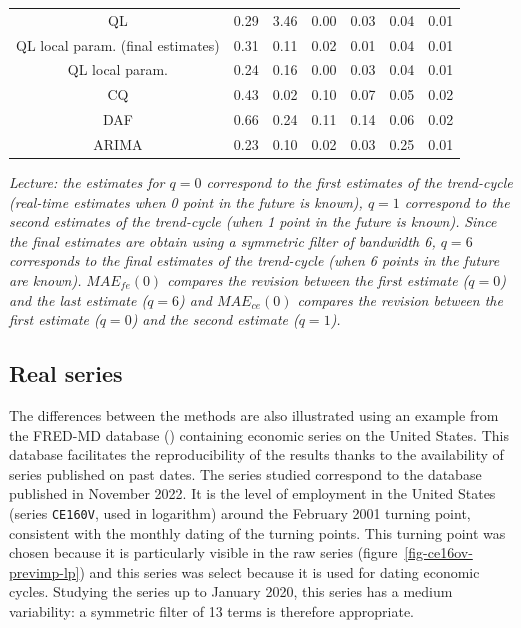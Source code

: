\documentclass[
]{article}
\newcommand\1{\mathds{1}}
\begin{document}
\begin{table}
{\begin{tabular}{ccccccc}
\hspace{1em}QL & 0.29 & 3.46 & 0.00 & 0.03 & 0.04 & 0.01\\
\hspace{1em}QL local param. (final estimates) & 0.31 & 0.11 & 0.02 & 0.01 & 0.04 & 0.01\\
\hspace{1em}QL local param. & 0.24 & 0.16 & 0.00 & 0.03 & 0.04 & 0.01\\
\hspace{1em}CQ & 0.43 & 0.02 & 0.10 & 0.07 & 0.05 & 0.02\\
\hspace{1em}DAF & 0.66 & 0.24 & 0.11 & 0.14 & 0.06 & 0.02\\
\hspace{1em}ARIMA & 0.23 & 0.10 & 0.02 & 0.03 & 0.25 & 0.01\\
\bottomrule
\end{tabular}

\justifying

\emph{Lecture: the estimates for \(q=0\) correspond to the first
estimates of the trend-cycle (real-time estimates when 0 point in the
future is known), \(q=1\) correspond to the second estimates of the
trend-cycle (when 1 point in the future is known).} \emph{Since the
final estimates are obtain using a symmetric filter of bandwidth 6,
\(q=6\) corresponds to the final estimates of the trend-cycle (when 6
points in the future are known).} \emph{\(MAE_{fe}(0)\) compares the
revision between the first estimate (\(q=0\)) and the last estimate
(\(q=6\)) and \(MAE_{ce}(0)\) compares the revision between the first
estimate (\(q=0\)) and the second estimate (\(q=1\)).}

}

\end{table}%

\subsection{Real series}\label{real-series}

The differences between the methods are also illustrated using an
example from the FRED-MD database (\textcite{fredmd}) containing
economic series on the United States. This database facilitates the
reproducibility of the results thanks to the availability of series
published on past dates. The series studied correspond to the database
published in November 2022. It is the level of employment in the United
States (series \texttt{CE160V}, used in logarithm) around the February
2001 turning point, consistent with the monthly dating of the turning
points. This turning point was chosen because it is particularly visible
in the raw series (figure~\ref{fig-ce16ov-previmp-lp}) and this series
was select because it is used for dating economic cycles. Studying the
series up to January 2020, this series has a medium variability: a
symmetric filter of 13 terms is therefore appropriate.
\end{document}
